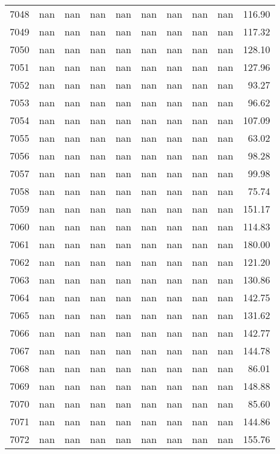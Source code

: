 \begin{tabular}{lrrrrrrrrr}
7048 & nan & nan & nan & nan & nan & nan & nan & nan & 116.90 \\
7049 & nan & nan & nan & nan & nan & nan & nan & nan & 117.32 \\
7050 & nan & nan & nan & nan & nan & nan & nan & nan & 128.10 \\
7051 & nan & nan & nan & nan & nan & nan & nan & nan & 127.96 \\
7052 & nan & nan & nan & nan & nan & nan & nan & nan & 93.27 \\
7053 & nan & nan & nan & nan & nan & nan & nan & nan & 96.62 \\
7054 & nan & nan & nan & nan & nan & nan & nan & nan & 107.09 \\
7055 & nan & nan & nan & nan & nan & nan & nan & nan & 63.02 \\
7056 & nan & nan & nan & nan & nan & nan & nan & nan & 98.28 \\
7057 & nan & nan & nan & nan & nan & nan & nan & nan & 99.98 \\
7058 & nan & nan & nan & nan & nan & nan & nan & nan & 75.74 \\
7059 & nan & nan & nan & nan & nan & nan & nan & nan & 151.17 \\
7060 & nan & nan & nan & nan & nan & nan & nan & nan & 114.83 \\
7061 & nan & nan & nan & nan & nan & nan & nan & nan & 180.00 \\
7062 & nan & nan & nan & nan & nan & nan & nan & nan & 121.20 \\
7063 & nan & nan & nan & nan & nan & nan & nan & nan & 130.86 \\
7064 & nan & nan & nan & nan & nan & nan & nan & nan & 142.75 \\
7065 & nan & nan & nan & nan & nan & nan & nan & nan & 131.62 \\
7066 & nan & nan & nan & nan & nan & nan & nan & nan & 142.77 \\
7067 & nan & nan & nan & nan & nan & nan & nan & nan & 144.78 \\
7068 & nan & nan & nan & nan & nan & nan & nan & nan & 86.01 \\
7069 & nan & nan & nan & nan & nan & nan & nan & nan & 148.88 \\
7070 & nan & nan & nan & nan & nan & nan & nan & nan & 85.60 \\
7071 & nan & nan & nan & nan & nan & nan & nan & nan & 144.86 \\
7072 & nan & nan & nan & nan & nan & nan & nan & nan & 155.76 \\

\end{tabular}
